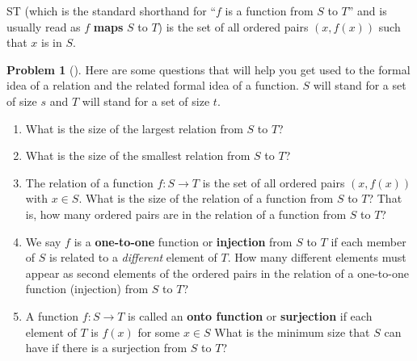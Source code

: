 \documentclass[10pt,]{book}
\newcommand{\terminology}[1]{\textbf{#1}}
\theoremstyle{plain}
\theoremstyle{definition}
\newtheorem{activity}[project]{Problem}
\theoremstyle{definition}
\numberwithin{equation}{chapter}
\begin{document}
S\rightarrow T\) (which is the standard shorthand for ``\(f\) is a function from \(S\) to \(T\)'' and is usually read as \(f\) \terminology{maps} \(S\) to \(T\)) is the set of all ordered pairs \((x,f(x))\) such that \(x\) is in \(S\).%
\begin{activity}[]\marginsymbol[-1em]{} \label{formalrelations}
Here are some questions that will help you get used to the formal idea of a relation and the related formal idea of a function. \(S\) will stand for a set of size \(s\) and \(T\) will stand for a set of size \(t\).%
\begin{enumerate}[font=\bfseries,label=(\alph*),ref=\alph*]
\item\label{task-235} \marginsymbol[-2.5em]{} What is the size of the largest relation from \(S\) to \(T\)?%
\item\label{task-236} \marginsymbol[-2.5em]{} What is the size of the smallest relation from \(S\) to \(T\)?%
\item\label{task-237} \marginsymbol[-2.5em]{} The relation of a function \(f:S\rightarrow T\) is the set of all ordered pairs \((x,f(x))\) with \(x\in S\).  What is the size of the relation of a function from \(S\) to \(T\)?  That is, how many ordered pairs are in the relation of a function from \(S\) to \(T\)?%
\item\label{task-238} \marginsymbol[-2.5em]{} We say \(f\) is a \terminology{one-to-one} function or \terminology{injection} from \(S\) to \(T\) if each member of \(S\) is related to a \emph{different} element of \(T\). How many different elements must appear as second elements of the ordered pairs in the relation of a one-to-one function (injection) from \(S\) to \(T\)?%
\item\label{onto} \marginsymbol[-2.5em]{} A function \(f:S\rightarrow T\) is called an \terminology{onto function} or \terminology{surjection} if each element of \(T\) is \(f(x)\) for some \(x\in S\) What is the minimum size that \(S\) can have if there is a  surjection from \(S\) to \(T\)?%
\end{enumerate}
\end{activity}
\end{document}

